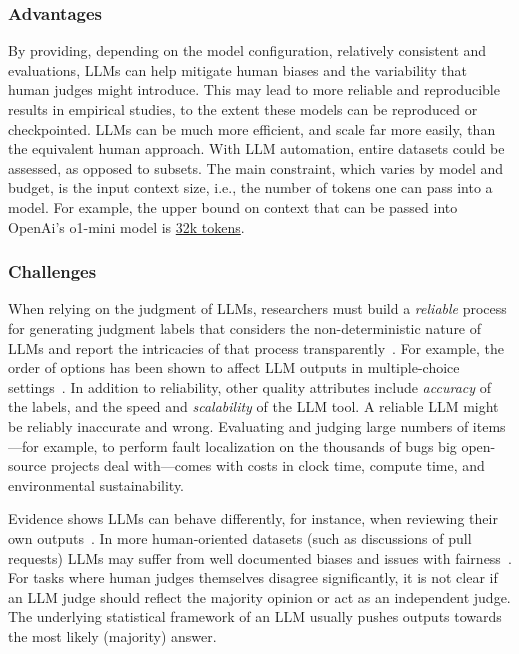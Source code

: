 \subsubsection{Advantages}

By providing, depending on the model configuration, relatively consistent and evaluations, LLMs can help mitigate human biases and the variability that human judges might introduce.
This may lead to more reliable and reproducible results in empirical studies, to the extent these models can be reproduced or checkpointed.
LLMs can be much more efficient, and scale far more easily, than the equivalent human approach. With LLM automation, entire datasets could be assessed, as opposed to subsets. The main constraint, which varies by model and budget, is the input context size, i.e., the number of tokens one can pass into a model. For example, the upper bound on context that can be passed into OpenAi's \textsf{o1-mini} model is \href{https://help.openai.com/en/articles/9855712-openai-o1-models-faq-chatgpt-enterprise-and-edu}{32k tokens}. 

\subsubsection{Challenges}

When relying on the judgment of LLMs, researchers must build a \textit{reliable} process for generating judgment labels that considers the non-deterministic nature of LLMs and report the intricacies of that process transparently~\cite{DBLP:journals/corr/abs-2412-12509}. For example, the order of options has been shown to affect LLM outputs in multiple-choice settings~\cite{DBLP:conf/naacl/PezeshkpourH24}. 
In addition to reliability, other quality attributes include \textit{accuracy} of the labels, and the speed and \textit{scalability} of the LLM tool. 
A reliable LLM might be reliably inaccurate and wrong. 
Evaluating and judging large numbers of items---for example, to perform fault localization on the thousands of bugs big open-source projects deal with---comes with costs in clock time, compute time, and environmental sustainability.

Evidence shows LLMs can behave differently, for instance, when reviewing their own outputs~\cite{NEURIPS2024_7f1f0218}. In more human-oriented datasets (such as discussions of pull requests) LLMs may suffer from well documented biases and issues with fairness~\cite{Gallegos2024BiasAF}. 
For tasks where human judges themselves disagree significantly, it is not clear if an LLM judge should reflect the majority opinion or act as an independent judge. The underlying statistical framework of an LLM usually pushes outputs towards the most likely (majority) answer. 

